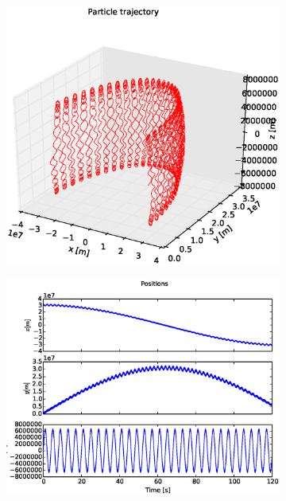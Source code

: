 \documentclass[x11names]{article}
\begin{document}
    \begin{figure}[ht]
      \begin{subfigure}{0.33\textwidth}
        \includegraphics[width = \textwidth]{figures/rk4_3D_6_2}
      \end{subfigure}
      \begin{subfigure}{0.33\textwidth}
        \includegraphics[width = \textwidth]{figures/rk4_xyz_6_2}
      \end{subfigure}
      \begin{subfigure}{0.33\textwidth}

\end{subfigure}
\end{figure}
\end{document}
